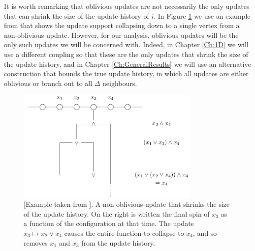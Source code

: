 	
	It is worth remarking that oblivious updates are not necessarily the only updates that can shrink the size of the update history of $i$. In Figure \ref{fig:nonoblivious shrink} we use an example from \cite{Lubetzky2016-wd} that shows the update support collapsing down to a single vertex from a non-oblivious update. However, for our analysis, oblivious updates will be the only such updates we will be concerned with. Indeed, in Chapter \ref{Ch:1D} we will use a different coupling so that these are the only updates that shrink the size of the update history, and in Chapter \ref{Ch:GeneralResults} we will use an alternative construction that bounds the true update history, in which all updates are either oblivious or branch out to all $\Delta$ neighbours.

	\begin{figure}
		\centering
		\includegraphics[width = 0.8\textwidth]{Figures/IsingCouplingTime/nonoblivious_shrink.pdf}
		\caption[A non-oblivious update that shrinks the size of the update history]{[Example taken from \cite{Lubetzky2016-wd}]. A non-oblivious update that shrinks the size of the update history. On the right is written the final spin of $x_3$ as a function of the configuration at that time. The update $x_3 \mapsto x_2 \vee x_4$ causes the entire function to collapse to $x_4$, and so removes $x_1$ and $x_3$ from the update history.}
		\label{fig:nonoblivious shrink}
	\end{figure}
	

